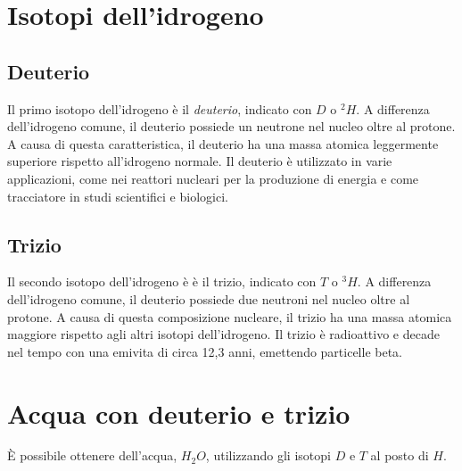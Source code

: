 \documentclass[a4paper]{article}
\begin{document}




\pagebreak

\section{Isotopi dell'idrogeno}

\subsection{Deuterio}

Il primo isotopo dell'idrogeno è il \textit{deuterio}, indicato con \(D\) o \(^2H\).
A differenza dell'idrogeno comune, il deuterio possiede un neutrone nel nucleo oltre al protone.
A causa di questa caratteristica, il deuterio ha una massa atomica leggermente superiore rispetto all'idrogeno normale.
Il deuterio è utilizzato in varie applicazioni, come nei reattori nucleari per la produzione di energia e come tracciatore in studi scientifici e biologici. 

\subsection{Trizio}

Il secondo isotopo dell'idrogeno è è il trizio, indicato con \(T\) o \(^3H\).
A differenza dell'idrogeno comune, il deuterio possiede due neutroni nel nucleo oltre al protone.
A causa di questa composizione nucleare, il trizio ha una massa atomica maggiore rispetto agli altri isotopi dell'idrogeno.
Il trizio è radioattivo e decade nel tempo con una emivita di circa 12,3 anni, emettendo particelle beta.

\section{Acqua con deuterio e trizio}

È possibile ottenere dell'acqua, \(H_2O\), utilizzando gli isotopi \(D\) e \(T\) al posto di \(H\).
\end{document}
